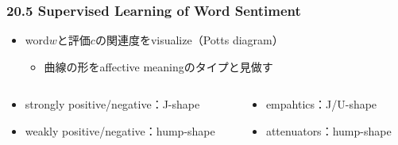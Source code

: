 \begin{frame}
    \frametitle{20.5 Supervised Learning of Word Sentiment}
    \begin{itemize}
        \item word$w$と評価$c$の関連度をvisualize（Potts diagram）
        \begin{itemize}
            \item 曲線の形をaffective meaningのタイプと見做す
        \end{itemize}
    \end{itemize}
    \begin{columns}
        \begin{column}[T]{0.5\textwidth}
            \begin{itemize}
                \footnotesize
                \item strongly positive/negative：J-shape
                \item weakly positive/negative：hump-shape
            \end{itemize}
        \end{column}
        \begin{column}[T]{0.5\textwidth}
            \begin{itemize}
                \footnotesize
                \item empahtics：J/U-shape
                \item attenuators：hump-shape
            \end{itemize}
        \end{column}
    \end{columns}
\end{frame}


